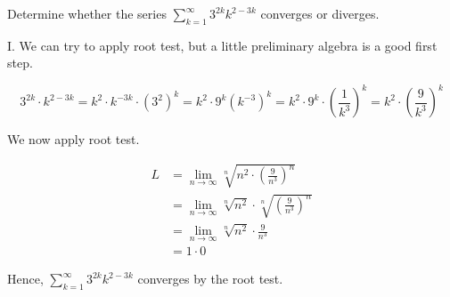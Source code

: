 \documentclass[noauthor,handout]{ximera}
\begin{document}
\begin{problem}
Determine whether the series $\sum_{k=1}^\infty 3^{2k} k^{2-3k}$ converges or diverges.

\begin{freeResponse}
I.  We can try to apply root test, but a little preliminary algebra is a good first step.

\[
3^{2k} \cdot k^{2-3k} = k^2\cdot k^{-3k} \cdot \left(3^2\right)^k= k^2 \cdot 9^k \left(k^{-3}\right)^k = k^2\cdot 9^k \cdot \left(\frac{1}{k^3}\right)^k = k^2\cdot \left(\frac{9}{k^3}\right)^k
\]

We now apply root test.

\begin{align*}
L &= \lim_{n \to \infty} \sqrt[n]{ n^2\cdot \left(\frac{9}{n^3}\right)^n} \\
&= \lim_{n \to \infty} \sqrt[n]{ n^2} \cdot \sqrt[n]{\left(\frac{9}{n^3}\right)^n} \\
&= \lim_{n \to \infty} \sqrt[n]{ n^2} \cdot \frac{9}{n^3} \\
&= 1 \cdot 0
\end{align*}

Hence, $\sum_{k=1}^\infty 3^{2k}k^{2-3k}$ converges by the root test.

\end{freeResponse}
\end{problem}
\end{document}
